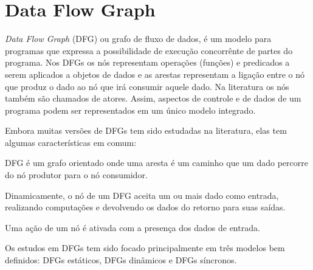 
\chapter{Data Flow Graph}

\textit{Data Flow Graph} (DFG) ou grafo de fluxo de dados, é um modelo para 
programas que expressa a possibilidade de execução concorrênte de partes do
programa. 
Nos DFGs os nós representam operações (funções) e predicados a serem
aplicados a objetos de dados e as arestas representam a ligação entre o nó que
produz o dado ao nó que irá consumir aquele dado.
Na literatura os nós também são chamados de atores.
Assim, aspectos de controle e de dados de um programa podem ser representados 
em um único modelo integrado.

Embora muitas versões de DFGs tem sido estudadas na literatura, elas tem algumas
características em comum:

\begin{alineas}
        \item DFG é um grafo orientado onde uma aresta é um caminho que um dado
        percorre do nó produtor para o nó consumidor.
        \item Dinamicamente, o nó de um DFG aceita um ou mais dado como entrada,
        realizando computações e devolvendo os dados do retorno para suas
        saídas.
        \item Uma ação de um nó é ativada com a presença dos dados de entrada.
\end{alineas}

Os estudos em DFGs tem sido focado principalmente em três modelos bem definidos:
DFGs estáticos, DFGs dinâmicos e DFGs síncronos.



